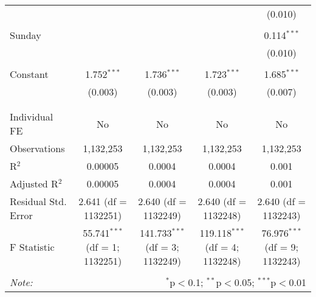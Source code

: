 \documentclass[
]{article}
\begin{document}
\begin{table}[!htbp]
{\begin{tabular}{@{\extracolsep{5pt}}lcccc}
  &  &  &  & (0.010) \\ 
  & & & & \\ 
 Sunday &  &  &  & 0.114$^{***}$ \\ 
  &  &  &  & (0.010) \\ 
  & & & & \\ 
 Constant & 1.752$^{***}$ & 1.736$^{***}$ & 1.723$^{***}$ & 1.685$^{***}$ \\ 
  & (0.003) & (0.003) & (0.003) & (0.007) \\ 
  & & & & \\ 
\hline \\[-1.8ex] 
Individual FE & No & No & No & No \\ 
Observations & 1,132,253 & 1,132,253 & 1,132,253 & 1,132,253 \\ 
R$^{2}$ & 0.00005 & 0.0004 & 0.0004 & 0.001 \\ 
Adjusted R$^{2}$ & 0.00005 & 0.0004 & 0.0004 & 0.001 \\ 
Residual Std. Error & 2.641 (df = 1132251) & 2.640 (df = 1132249) & 2.640 (df = 1132248) & 2.640 (df = 1132243) \\ 
F Statistic & 55.741$^{***}$ (df = 1; 1132251) & 141.733$^{***}$ (df = 3; 1132249) & 119.118$^{***}$ (df = 4; 1132248) & 76.976$^{***}$ (df = 9; 1132243) \\ 
\hline 
\hline \\[-1.8ex] 
\textit{Note:}  & \multicolumn{4}{r}{$^{*}$p$<$0.1; $^{**}$p$<$0.05; $^{***}$p$<$0.01} \\ 
\end{tabular}
} 
\end{table} 
\newpage
\end{document}
